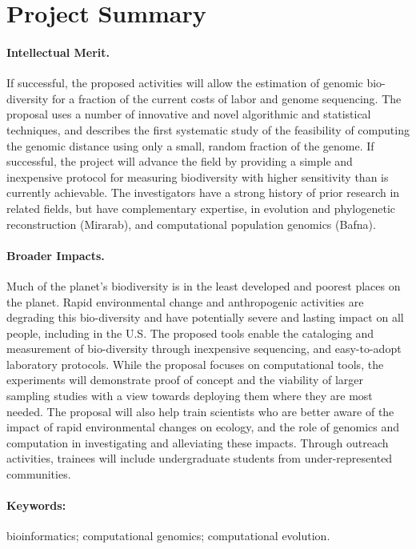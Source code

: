 \section*{Project Summary}


\paragraph{Intellectual Merit.} 
If successful, the proposed activities will allow the estimation of
genomic bio-diversity for a fraction of the current costs of labor and
genome sequencing. The proposal uses a number of innovative and novel
algorithmic and statistical techniques, and describes the first
systematic study of the feasibility of computing the genomic distance using only a small, random fraction of the genome.  If successful, the project will advance the field by providing a simple and inexpensive protocol for measuring biodiversity with higher sensitivity than is currently achievable. The investigators
have a strong history of prior research in related fields, but have
complementary expertise, in evolution and phylogenetic reconstruction
(Mirarab), and computational population genomics (Bafna).

\paragraph{Broader Impacts.}
Much of the planet's biodiversity is in the least developed and
poorest places on the planet. Rapid environmental change and
anthropogenic activities are degrading this bio-diversity and have
potentially severe and lasting impact on all people, including in the
U.S. The proposed tools enable the cataloging and measurement of
bio-diversity through inexpensive sequencing, and easy-to-adopt
laboratory protocols. While the proposal focuses on computational
tools, the experiments will demonstrate proof of concept and the
viability of larger sampling studies with a view towards deploying
them where they are most needed. The proposal will also help train
scientists who are better aware of the impact of rapid environmental
changes on ecology, and the role of genomics and computation in
investigating and alleviating these impacts. Through outreach activities, trainees will include undergraduate students from under-represented communities.

\paragraph{Keywords:} bioinformatics; computational genomics; computational evolution.
